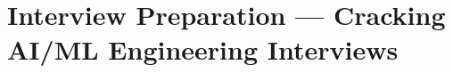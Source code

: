 \documentclass{sweai}
\begin{document}





\part{Interview Preparation --- Cracking AI/ML Engineering Interviews}
\label{part:interviews}




\backmatter



\printbibliography[heading=bibintoc,title={References}]


\end{document}
